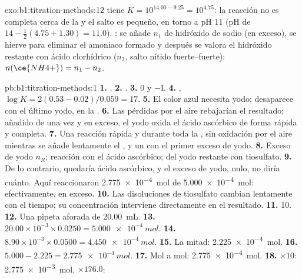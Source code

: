\begin{solution}{exo:b1:titration-methods:12}
 tiene $K = 10^{14.00 - 9.25} = 10^{4.75}$:
la reacción no es completa cerca de la  y el salto es
pequeño, en torno a pH 11 (pH de 
$14 - \frac12(4.75 + 1.30) = 11.0$). : se añade
$n_1$ de hidróxido de sodio (en exceso), se hierve para eliminar el
amoniaco formado y después se valora el hidróxido restante con ácido
clorhídrico ($n_2$, salto nítido fuerte--fuerte):
$n(\ce{NH4+}) = n_1 - n_2$.
\end{solution}

\begin{solution}{pb:b1:titration-methods:1}
\textbf{1.} .
\textbf{2.} .
\textbf{3.} 0 y $-$I.
\textbf{4.} , $\log K = 2(0.53 - 0.02)/0.059
= 17$.
\textbf{5.} El color azul necesita yodo; desaparece con el último yodo,
en la .
\textbf{6.} Las pérdidas por el aire rebajarían el resultado; añadido de
una vez y en exceso, el yodo oxida el ácido ascórbico de forma rápida y
completa.
\textbf{7.} Una reacción rápida y  durante toda la
, sin oxidación por el aire mientras se añade lentamente el
, y un  con el primer exceso de yodo.
\textbf{8.} Exceso de yodo $n_R$; reacción con el ácido ascórbico;
 del yodo restante con tiosulfato.
\textbf{9.} De lo contrario, quedaría ácido ascórbico, y el exceso de
yodo, nulo, no diría cuánto. Aquí reaccionaron \qty{2.775e-4}{mol} de
\qty{5.000e-4}{mol}: efectivamente, en exceso.
\textbf{10.} Las disoluciones de tiosulfato cambian lentamente con el
tiempo; su concentración interviene directamente en el resultado.
\textbf{11.} 10.
\textbf{12.} Una pipeta aforada de \qty{20.00}{mL}.
\textbf{13.} $20.00 \times 10^{-3} \times 0.0250 = \qty{5.000e-4}{mol}$.
\textbf{14.} $8.90 \times 10^{-3} \times 0.0500 = \qty{4.450e-4}{mol}$.
\textbf{15.} La mitad: \qty{2.225e-4}{mol}.
\textbf{16.} $5.000 - 2.225 = \qty{2.775e-4}{mol}$.
\textbf{17.} Mol a mol: \qty{2.775e-4}{mol}.
\textbf{18.} $\times 10$: \qty{2.775e-3}{mol}, $\times 176.0$:

\end{solution}
